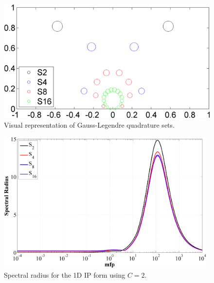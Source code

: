\begin{figure}
\label{fig::1D_gauss_quadrature}
\centering
\includegraphics[width=\textwidth]{figures/appendices/1D_Gauss_Quad.png}
\caption{Visual representation of Gauss-Legendre quadrature sets.}
\end{figure}




\begin{figure}
\label{fig::1D_IP_c=2}
\centering
\includegraphics[width=0.98\textwidth]{figures/appendices/DSA_1D_SI_IP_C=2.png}
\caption{Spectral radius for the 1D IP form using $C=2$.}
\end{figure}

